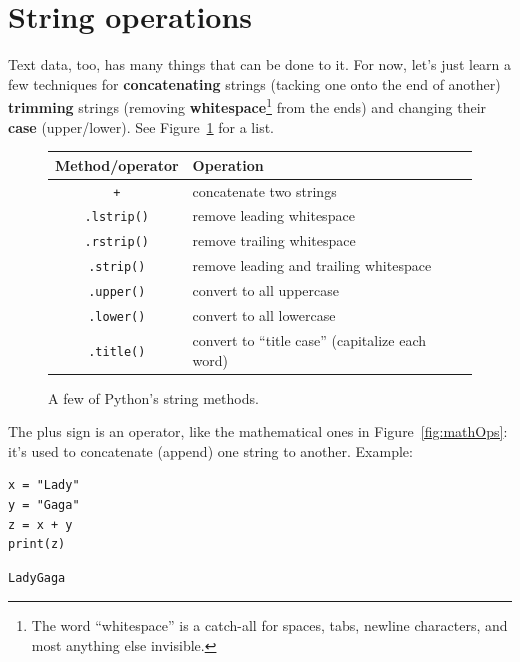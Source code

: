 \section{String operations}

\label{concatenatingStrings}
Text data, too, has many things that can be done to it. For now, let's just
learn a few techniques for \textbf{concatenating} strings (tacking one onto the
end of another) \textbf{trimming} strings (removing
\textbf{whitespace}\footnote{The word ``whitespace'' is a catch-all for spaces,
tabs, newline characters, and most anything else invisible.} from the ends) and
changing their \textbf{case} (upper/lower). See Figure~\ref{fig:stringOps} for
a list.

\begin{figure}[ht]
\small
\centering
\begin{tabular}{c | l}
\hline
Method/operator & Operation \\
\hline
\texttt{+} & concatenate two strings \\
\texttt{.lstrip()} & remove leading whitespace \\
\texttt{.rstrip()} & remove trailing whitespace \\
\texttt{.strip()} & remove leading and trailing whitespace \\
\texttt{.upper()} & convert to all uppercase \\
\texttt{.lower()} & convert to all lowercase \\
\texttt{.title()} & convert to ``title case'' (capitalize each word) \\
\hline
\end{tabular}
\smallskip
\caption{A few of Python's string methods.}
\label{fig:stringOps}
\end{figure}

The plus sign is an operator, like the mathematical ones in
Figure~\ref{fig:mathOps}: it's used to concatenate (append) one string to
another. Example:

\begin{Verbatim}[fontsize=\small,samepage=true,frame=single,framesep=3mm]
x = "Lady"
y = "Gaga"
z = x + y
print(z)
\end{Verbatim}

\begin{Verbatim}[fontsize=\small,samepage=true,frame=leftline,framesep=5mm,framerule=1mm]
LadyGaga
\end{Verbatim}

